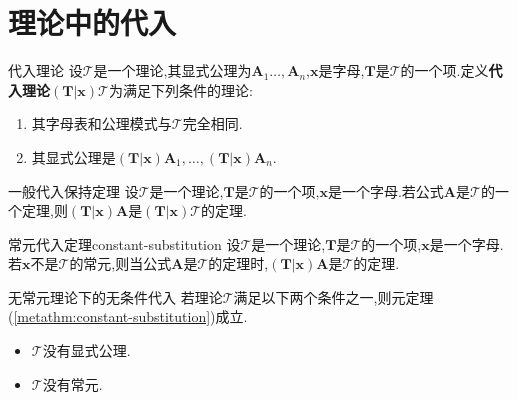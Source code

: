 \section{理论中的代入}

\begin{definition}{代入理论}{}
	设$\mathcal{T}$是一个理论,其显式公理为$\boldsymbol{A}_{1}\ldots,\boldsymbol{A}_{n}$,$\boldsymbol{x}$是字母,$\boldsymbol{T}$是$\mathcal{T}$的一个项.定义\textbf{代入理论}$\left(\boldsymbol{T}|\boldsymbol{x}\right)\mathcal{T}$为满足下列条件的理论:
	\begin{enumerate}
		\item 其字母表和公理模式与$\mathcal{T}$完全相同.
		\item 其显式公理是$\left(\boldsymbol{T}|\boldsymbol{x}\right)\boldsymbol{A}_{1},\ldots,\left(\boldsymbol{T}|\boldsymbol{x}\right)\boldsymbol{A}_{n}$.
	\end{enumerate}
\end{definition}

\begin{metatheorem}{一般代入保持定理}{}
	设$\mathcal{T}$是一个理论,$\boldsymbol{T}$是$\mathcal{T}$的一个项,$\boldsymbol{x}$是一个字母.若公式$\boldsymbol{A}$是$\mathcal{T}$的一个定理,则$\left(\boldsymbol{T}|\boldsymbol{x}\right)\boldsymbol{A}$是$\left(\boldsymbol{T}|\boldsymbol{x}\right)\mathcal{T}$的定理.
\end{metatheorem}

\begin{metatheorem}{常元代入定理}{constant-substitution}
	设$\mathcal{T}$是一个理论,$\boldsymbol{T}$是$\mathcal{T}$的一个项,$\boldsymbol{x}$是一个字母.若$\boldsymbol{x}$不是$\mathcal{T}$的常元,则当公式$\boldsymbol{A}$是$\mathcal{T}$的定理时,$\left(\boldsymbol{T}|\boldsymbol{x}\right)\boldsymbol{A}$是$\mathcal{T}$的定理.
\end{metatheorem}

\begin{corollary}{无常元理论下的无条件代入}{}
	若理论$\mathcal{T}$满足以下两个条件之一,则元定理(\cref{metathm:constant-substitution})成立.
	\begin{itemize}
		\item $\mathcal{T}$没有显式公理.
		\item $\mathcal{T}$没有常元.
	\end{itemize}
\end{corollary}
